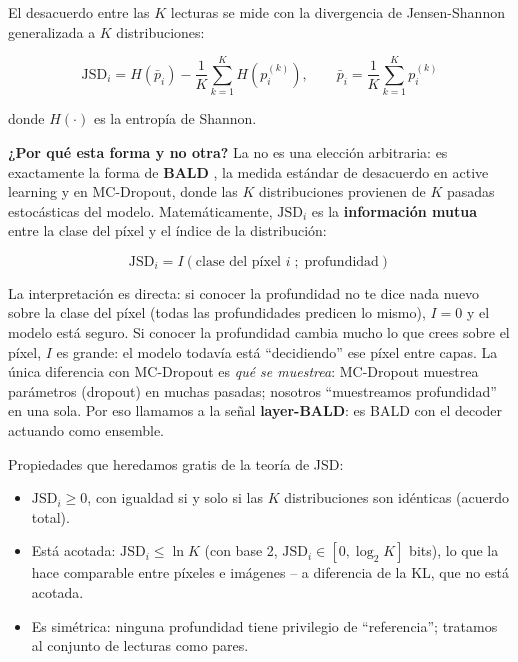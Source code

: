\documentclass[12pt,a4paper]{article}
\newcommand{\JSD}{\mathrm{JSD}}
\begin{document}
El desacuerdo entre las $K$ lecturas se mide con la divergencia de Jensen-Shannon generalizada a $K$ distribuciones:

\begin{equation}
\JSD_i = H\!\left(\bar{p}_i\right) - \frac{1}{K}\sum_{k=1}^{K} H\!\left(p_i^{(k)}\right),
\qquad
\bar{p}_i = \frac{1}{K}\sum_{k=1}^{K} p_i^{(k)}
\label{eq:jsd-conjunto}
\end{equation}

donde $H(\cdot)$ es la entropía de Shannon.

\textbf{¿Por qué esta forma y no otra?}
La  no es una elección arbitraria: es exactamente la forma de \textbf{BALD} \citep{gal2016dropout}, la medida estándar de desacuerdo en active learning y en MC-Dropout, donde las $K$ distribuciones provienen de $K$ pasadas estocásticas del modelo.
Matemáticamente, $\JSD_i$ es la \textbf{información mutua} entre la clase del píxel y el índice de la distribución:

\begin{equation}
\JSD_i = I(\text{clase del píxel } i \;;\; \text{profundidad})
\end{equation}

La interpretación es directa: si conocer la profundidad no te dice nada nuevo sobre la clase del píxel (todas las profundidades predicen lo mismo), $I = 0$ y el modelo está seguro.
Si conocer la profundidad cambia mucho lo que crees sobre el píxel, $I$ es grande: el modelo todavía está ``decidiendo'' ese píxel entre capas.
La única diferencia con MC-Dropout es \emph{qué se muestrea}: MC-Dropout muestrea parámetros (dropout) en muchas pasadas; nosotros ``muestreamos profundidad'' en una sola.
Por eso llamamos a la señal \textbf{layer-BALD}: es BALD con el decoder actuando como ensemble.

Propiedades que heredamos gratis de la teoría de JSD:

\begin{itemize}
    \item $\JSD_i \geq 0$, con igualdad si y solo si las $K$ distribuciones son idénticas (acuerdo total).
    \item Está acotada: $\JSD_i \leq \ln K$ (con base 2, $\JSD_i \in [0, \log_2 K]$ bits), lo que la hace comparable entre píxeles e imágenes -- a diferencia de la KL, que no está acotada.
    \item Es simétrica: ninguna profundidad tiene privilegio de ``referencia''; tratamos al conjunto de lecturas como pares.
\end{itemize}
\end{document}
